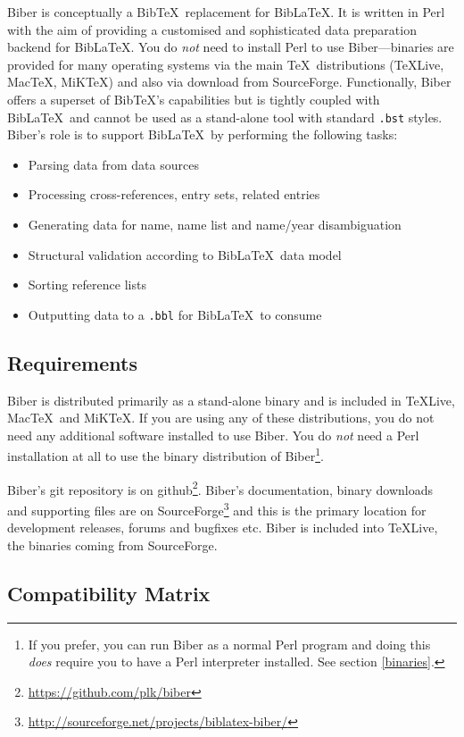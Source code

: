\documentclass{ltxdockit}
\begin{document}
Biber is conceptually a Bib\TeX\ replacement for
Bib\LaTeX. It is written in Perl with the aim of providing a
customised and sophisticated data preparation backend for Bib\LaTeX.
You do \emph{not} need to install Perl to use Biber---binaries
are provided for many operating systems via the main \TeX\
distributions (\TeX Live, Mac\TeX, MiK\TeX) and also via download from SourceForge.
Functionally, Biber offers a superset of Bib\TeX's capabilities but is
tightly coupled with Bib\LaTeX\ and cannot be used as a stand-alone tool
with standard \verb+.bst+ styles. Biber's role is to support
Bib\LaTeX\ by performing the following tasks:

\begin{itemize}
\item Parsing data from data sources
\item Processing cross-references, entry sets, related entries
\item Generating data for name, name list and name/year disambiguation
\item Structural validation according to Bib\LaTeX\ data model
\item Sorting reference lists
\item Outputting data to a \verb+.bbl+ for Bib\LaTeX\ to consume
\end{itemize}

\subsection{Requirements}\label{ref:req}

Biber is distributed primarily as a stand-alone binary and is
included in \TeX Live, Mac\TeX\ and MiK\TeX. If you are using any of these
distributions, you do not need any additional software installed to use
Biber. You do \emph{not} need a Perl installation at all to use
the binary distribution of Biber\footnote{If you prefer, you can run
Biber as a normal Perl program and doing this \emph{does} require
you to have a Perl interpreter installed. See section \ref{binaries}.}.

Biber's git repository is on
github\footnote{\url{https://github.com/plk/biber}}. Biber's documentation,
binary downloads and supporting files are on
SourceForge\footnote{\url{http://sourceforge.net/projects/biblatex-biber/}}
and this is the primary location for development releases, forums and
bugfixes etc. Biber is included into \TeX Live, the binaries coming from
SourceForge.

\subsection{Compatibility Matrix}
\end{document}
